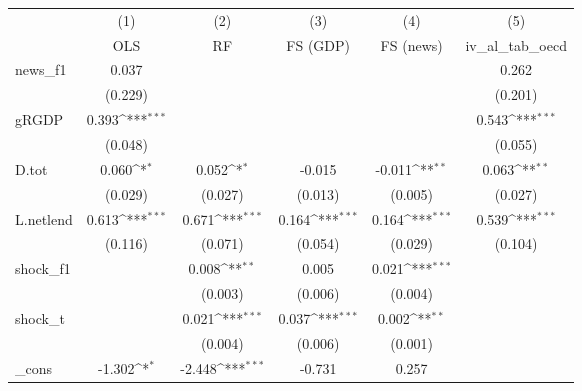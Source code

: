 {
\def\sym#1{\ifmmode^{#1}\else\(^{#1}\)\fi}
\begin{tabular}{l*{5}{c}}
\toprule
            &\multicolumn{1}{c}{(1)}&\multicolumn{1}{c}{(2)}&\multicolumn{1}{c}{(3)}&\multicolumn{1}{c}{(4)}&\multicolumn{1}{c}{(5)}\\
            &\multicolumn{1}{c}{OLS}&\multicolumn{1}{c}{RF}&\multicolumn{1}{c}{FS (GDP)}&\multicolumn{1}{c}{FS (news)}&\multicolumn{1}{c}{iv\_al\_tab\_oecd}\\
\midrule
news\_f1     &       0.037         &                     &                     &                     &       0.262         \\
            &     (0.229)         &                     &                     &                     &     (0.201)         \\
\addlinespace
gRGDP       &       0.393\sym{***}&                     &                     &                     &       0.543\sym{***}\\
            &     (0.048)         &                     &                     &                     &     (0.055)         \\
\addlinespace
D.tot       &       0.060\sym{*}  &       0.052\sym{*}  &      -0.015         &      -0.011\sym{**} &       0.063\sym{**} \\
            &     (0.029)         &     (0.027)         &     (0.013)         &     (0.005)         &     (0.027)         \\
\addlinespace
L.netlend   &       0.613\sym{***}&       0.671\sym{***}&       0.164\sym{***}&       0.164\sym{***}&       0.539\sym{***}\\
            &     (0.116)         &     (0.071)         &     (0.054)         &     (0.029)         &     (0.104)         \\
\addlinespace
shock\_f1    &                     &       0.008\sym{**} &       0.005         &       0.021\sym{***}&                     \\
            &                     &     (0.003)         &     (0.006)         &     (0.004)         &                     \\
\addlinespace
shock\_t     &                     &       0.021\sym{***}&       0.037\sym{***}&       0.002\sym{**} &                     \\
            &                     &     (0.004)         &     (0.006)         &     (0.001)         &                     \\
\addlinespace
\_cons      &      -1.302\sym{*}  &      -2.448\sym{***}&      -0.731         &       0.257         &                     \\

\end{tabular}}
